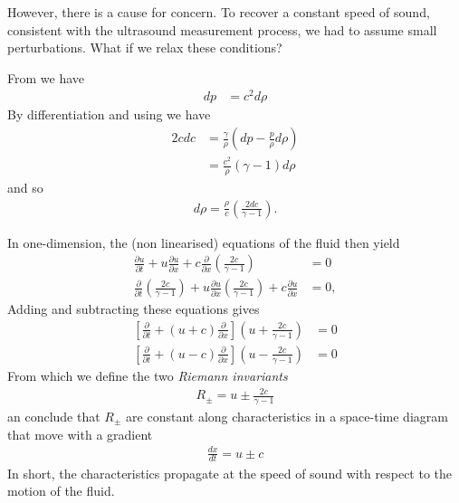 However, there is a cause for concern.
To recover a constant speed of sound, consistent with the ultrasound measurement process,
we had to assume small perturbations.
What if we relax these conditions?

From \eqnref{} we have
\begin{align}
  d p &= c^2 d\rho
\end{align}
By differentiation \eqnref{} and using 
we have
\begin{align}
2 c dc &= \frac{\gamma}{\rho} \left(dp - \frac{p}{\rho}d\rho\right)  \\
       &= \frac{c^2}{\rho}\left(\gamma-1\right) d\rho
\end{align}
and so
\begin{align}
d\rho = \frac{\rho}{c}\left(\frac{2dc}{\gamma - 1}\right).
\end{align}

In one-dimension, the (non linearised) equations of the fluid then yield
\begin{align}
 \frac{\partial u}{\partial t} + u \frac{\partial u}{\partial x} + c\frac{\partial }{\partial x}\left(\frac{2c}{\gamma - 1}\right)  &= 0  \label{eqn:euclidianNSRiemann}\\
 \frac{\partial }{\partial t} \left(\frac{2c}{\gamma - 1} \right)+ u \frac{\partial u}{\partial x} \left(\frac{2c}{\gamma - 1} \right) + c\frac{\partial u}{\partial x} &= 0,\label{eqn:euclidianContinuityRiemann}
\end{align}
Adding and subtracting these equations gives
\begin{align}
\left[ \frac{\partial }{\partial t} + (u + c) \frac{\partial }{\partial x} \right]\left(u + \frac{2c}{\gamma - 1} \right) &= 0 \\
\left[ \frac{\partial }{\partial t} + (u - c) \frac{\partial }{\partial x} \right]\left(u - \frac{2c}{\gamma - 1} \right) &= 0 
\end{align}
From which we define the two {\em Riemann invariants}
\begin{align}
R_\pm = u \pm \frac{2c}{\gamma - 1}
\end{align}
an conclude that $R_\pm$ are constant along characteristics in a space-time diagram that move with a gradient
\begin{align}
\frac{dx}{dt}= u\pm c
\end{align}
In short,
the characteristics propagate at the speed of sound with respect to the motion of the fluid.

